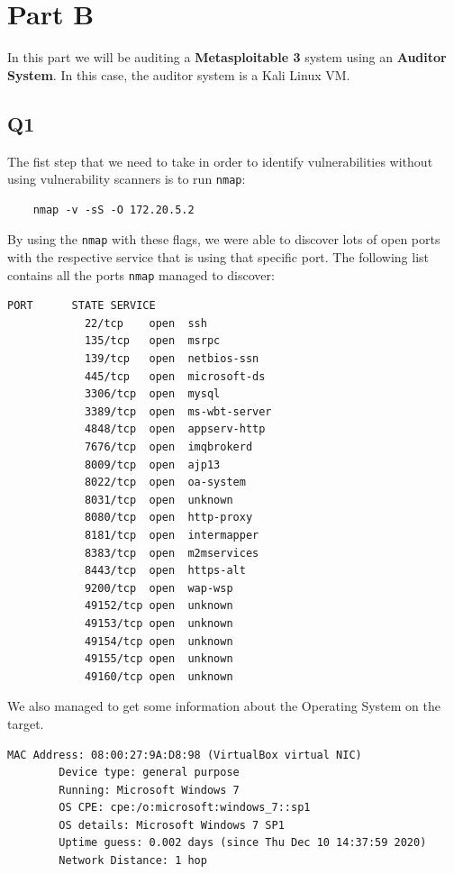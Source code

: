 \section{Part B}

In this part we will be auditing a \textbf{Metasploitable 3} system using an \textbf{Auditor System}. In this case, the auditor system is a Kali Linux VM.

\subsection{Q1}

The fist step that we need to take in order to identify vulnerabilities without using vulnerability scanners is to run \texttt{nmap}:

\begin{lstlisting}
    nmap -v -sS -O 172.20.5.2
\end{lstlisting}

By using the \texttt{nmap} with these flags, we were able to discover lots of open ports with the respective service that is using that specific port. The following list contains all the ports \texttt{nmap} managed to discover: 

\begin{lstlisting}[basicstyle=\scriptsize]
            PORT      STATE SERVICE
            22/tcp    open  ssh
            135/tcp   open  msrpc
            139/tcp   open  netbios-ssn
            445/tcp   open  microsoft-ds
            3306/tcp  open  mysql
            3389/tcp  open  ms-wbt-server
            4848/tcp  open  appserv-http
            7676/tcp  open  imqbrokerd
            8009/tcp  open  ajp13
            8022/tcp  open  oa-system
            8031/tcp  open  unknown
            8080/tcp  open  http-proxy
            8181/tcp  open  intermapper
            8383/tcp  open  m2mservices
            8443/tcp  open  https-alt
            9200/tcp  open  wap-wsp
            49152/tcp open  unknown
            49153/tcp open  unknown
            49154/tcp open  unknown
            49155/tcp open  unknown
            49160/tcp open  unknown

\end{lstlisting}

We also managed to get some information about the Operating System on the target.

\pagebreak

\begin{lstlisting}[basicstyle=\scriptsize]
        MAC Address: 08:00:27:9A:D8:98 (VirtualBox virtual NIC)
        Device type: general purpose
        Running: Microsoft Windows 7
        OS CPE: cpe:/o:microsoft:windows_7::sp1
        OS details: Microsoft Windows 7 SP1
        Uptime guess: 0.002 days (since Thu Dec 10 14:37:59 2020)
        Network Distance: 1 hop
\end{lstlisting}

